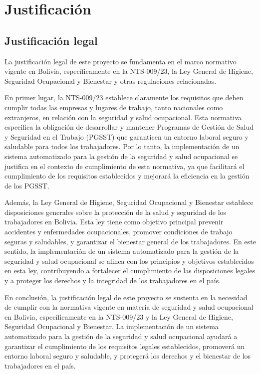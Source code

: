 \section{Justificación}
\subsection{Justificación legal}
La justificación legal de este proyecto se fundamenta en el marco normativo vigente en Bolivia, específicamente en la NTS-009/23, la Ley General de Higiene, Seguridad Ocupacional y Bienestar y otras regulaciones relacionadas.

En primer lugar, la NTS-009/23 establece claramente los requisitos que deben cumplir todas las empresas y lugares de trabajo, tanto nacionales como extranjeros, en relación con la seguridad y salud ocupacional. Esta normativa especifica la obligación de desarrollar y mantener Programas de Gestión de Salud y Seguridad en el Trabajo (PGSST) que garanticen un entorno laboral seguro y saludable para todos los trabajadores. Por lo tanto, la implementación de un sistema automatizado para la gestión de la seguridad y salud ocupacional se justifica en el contexto de cumplimiento de esta normativa, ya que facilitará el cumplimiento de los requisitos establecidos y mejorará la eficiencia en la gestión de los PGSST.

Además, la Ley General de Higiene, Seguridad Ocupacional y Bienestar establece disposiciones generales sobre la protección de la salud y seguridad de los trabajadores en Bolivia. Esta ley tiene como objetivo principal prevenir accidentes y enfermedades ocupacionales, promover condiciones de trabajo seguras y saludables, y garantizar el bienestar general de los trabajadores. En este sentido, la implementación de un sistema automatizado para la gestión de la seguridad y salud ocupacional se alinea con los principios y objetivos establecidos en esta ley, contribuyendo a fortalecer el cumplimiento de las disposiciones legales y a proteger los derechos y la integridad de los trabajadores en el país.

En conclusión, la justificación legal de este proyecto se sustenta en la necesidad de cumplir con la normativa vigente en materia de seguridad y salud ocupacional en Bolivia, específicamente en la NTS-009/23 y la Ley General de Higiene, Seguridad Ocupacional y Bienestar. La implementación de un sistema automatizado para la gestión de la seguridad y salud ocupacional ayudará a garantizar el cumplimiento de los requisitos legales establecidos, promoverá un entorno laboral seguro y saludable, y protegerá los derechos y el bienestar de los trabajadores en el país.

